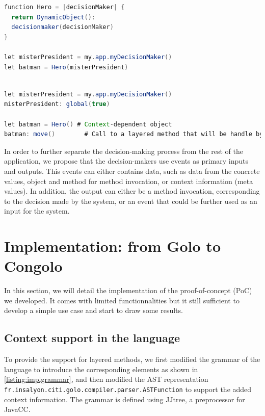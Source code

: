 \documentclass[a4paper]{article}
\begin{document}
\begin{lstlisting}[float, language=Java, caption=ConGolo decision maker definition, label={listing:congolodecisionmaker1}]
function Hero = |decisionMaker| {
  return DynamicObject():
  decisionmaker(decisionMaker)
}

let misterPresident = my.app.myDecisionMaker()
let batman = Hero(misterPresident)
\end{lstlisting}

\begin{lstlisting}[float, language=Java, caption=ConGolo example, label={listing:congolohero}]

let misterPresident = my.app.myDecisionMaker()
misterPresident: global(true)

let batman = Hero() # Context-dependent object
batman: move()        # Call to a layered method that will be handle by one of the global decision-maker

\end{lstlisting}

In order to further separate the decision-making process from the rest of the application, we propose that the decision-makers use events as primary inputs and outputs. This events can either contains data, such as data from the concrete values, object and method for method invocation, or context information (meta values). In addition, the output can either be a method invocation, corresponding to the decision made by the system, or an event that could be further used as an input for the system.

\section{Implementation: from Golo to Congolo}
\label{section:implementation}
In this section, we will detail the implementation of the proof-of-concept (PoC) we developed. It comes with limited functionnalities but it still sufficient to develop a simple use case and start to draw some results. 

\subsection{Context support in the language}
To provide the support for layered methods, we first modified the grammar of the language to introduce the corresponding elements as shown in \ref{listing:implgrammar}, and then modified the AST representation \lstinline|fr.insalyon.citi.golo.compiler.parser.ASTFunction| to support the added context information. The grammar is defined using JJtree, a preprocessor for JavaCC.
\end{document}
